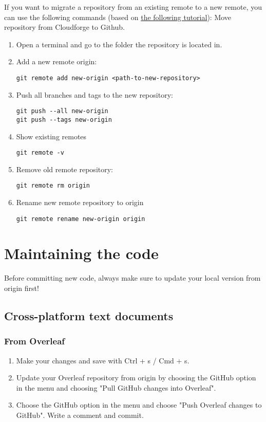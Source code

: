 \documentclass{report}
\begin{document}
If you want to migrate a repository from an existing remote to a new remote, you can use the following commands (based on \href{https://gist.github.com/niksumeiko/8972566}{the following tutorial}):
Move repository from Cloudforge to Github.
\begin{enumerate}[noitemsep]
    \item Open a terminal and go to the folder the repository is located in.
    \item Add a new remote origin:
    \begin{verbatim}
git remote add new-origin <path-to-new-repository>
    \end{verbatim}
    \item Push all branches and tags to the new repository:
    \begin{verbatim}
git push --all new-origin
git push --tags new-origin
    \end{verbatim}
    \item Show existing remotes
    \begin{verbatim}
git remote -v
    \end{verbatim}
    \item Remove old remote repository:
    \begin{verbatim}
git remote rm origin
    \end{verbatim} 
    \item Rename new remote repository to origin
    \begin{verbatim}
git remote rename new-origin origin
    \end{verbatim}
\end{enumerate}

\chapter{Maintaining the code}

Before committing new code, always make sure to update your local version from origin first!

\section{Cross-platform text documents}

\subsection{From Overleaf}

\begin{enumerate}[noitemsep]
    \item Make your changes and save with Ctrl + s / Cmd + s.
    \item Update your Overleaf repository from origin by choosing the GitHub option in the menu and choosing "Pull GitHub changes into Overleaf".
    \item Choose the GitHub option in the menu and choose "Push Overleaf changes to GitHub". Write a comment and commit.
\end{enumerate}
\end{document}
